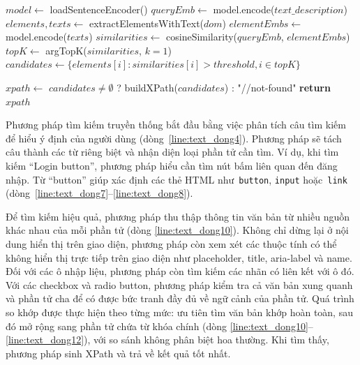 \documentclass[a4paper, 12pt]{report}
\begin{document}
{\begin{algorithm}[!hbpt]
\begin{algorithmic}[1]
         \label{line:text_dong21}
            \STATE $model \gets$ loadSentenceEncoder() \label{line:text_dong22}
            \STATE $queryEmb \gets$ model.encode($text\_description$) \label{line:text_dong23}
            \STATE $elements, texts \gets$ extractElementsWithText($dom$) \label{line:text_dong24}
            \STATE $elementEmbs \gets$ model.encode($texts$) \label{line:text_dong25}
            \STATE $similarities \gets$ cosineSimilarity($queryEmb$, $elementEmbs$) \label{line:text_dong26}
            \STATE $topK \gets$ argTopK($similarities$, $k=1$) \label{line:text_dong27}
            \STATE $candidates \gets \{elements[i] : similarities[i] > threshold, i \in topK\}$ \label{line:text_dong28}
        \ENDIF
        
        \STATE $xpath \gets$ $candidates \neq \emptyset$ ? buildXPath($candidates$) : "//not-found" \label{line:text_dong31}
        \STATE \textbf{return} $xpath$
    \end{algorithmic}
\end{algorithm}






Phương pháp tìm kiếm truyền thống bắt đầu bằng việc phân tích câu tìm kiếm để hiểu ý định của người dùng (dòng~\ref{line:text_dong4}). Phương pháp sẽ tách câu thành các từ riêng biệt và nhận diện loại phần tử cần tìm. Ví dụ, khi tìm kiếm ``Login button'', phương pháp hiểu cần tìm nút bấm liên quan đến đăng nhập. Từ ``button'' giúp xác định các thẻ HTML như~\texttt{button}, \texttt{input} hoặc~\texttt{link} (dòng~\ref{line:text_dong7}--\ref{line:text_dong8}).



Để tìm kiếm hiệu quả, phương pháp thu thập thông tin văn bản từ nhiều nguồn khác nhau của mỗi phần tử (dòng \ref{line:text_dong10}). Không chỉ dừng lại ở nội dung hiển thị trên giao diện, phương pháp còn xem xét các thuộc tính có thể không hiển thị trực tiếp trên giao diện như placeholder, title, aria-label và name. Đối với các ô nhập liệu, phương pháp còn tìm kiếm các nhãn có liên kết với ô đó. Với các checkbox và radio button, phương pháp kiểm tra cả văn bản xung quanh và phần tử cha để có được bức tranh đầy đủ về ngữ cảnh của phần tử. Quá trình so khớp được thực hiện theo từng mức: ưu tiên tìm văn bản khớp hoàn toàn, sau đó mở rộng sang phần tử chứa từ khóa chính (dòng \ref{line:text_dong10}–\ref{line:text_dong12}), với so sánh không phân biệt hoa thường. Khi tìm thấy, phương pháp sinh XPath và trả về kết quả tốt nhất.



}
\end{document}
